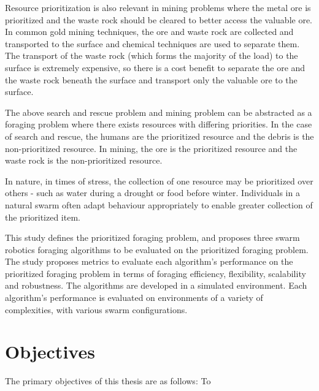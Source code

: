 Resource prioritization is also relevant in mining problems where the metal ore is prioritized and the waste rock should be cleared to better access the valuable ore. In common gold mining techniques, the ore and waste rock are collected and transported to the surface and chemical techniques are used to separate them. The transport of the waste rock (which forms the majority of the load) to the surface is extremely expensive, so there is a cost benefit to separate the ore and the waste rock beneath the surface and transport only the valuable ore to the surface.

The above search and rescue problem and mining problem can be abstracted as a foraging problem where there exists resources with differing priorities. In the case of search and rescue, the humans are the prioritized resource and the debris is the non-prioritized resource. In mining, the ore is the prioritized resource and the waste rock is the non-prioritized resource. 

In nature, in times of stress, the collection of one resource may be prioritized over others - such as water during a drought or food before winter. Individuals in a natural swarm often adapt behaviour appropriately to enable greater collection of the prioritized item.

This study defines the prioritized foraging problem, and proposes three swarm robotics foraging algorithms to be evaluated on the prioritized foraging problem. The study proposes metrics to evaluate each algorithm's performance on the prioritized foraging problem in terms of foraging efficiency, flexibility, scalability and robustness. The algorithms are developed in a simulated environment. Each algorithm's performance is evaluated on environments of a variety of complexities, with various swarm configurations.


\section{Objectives}
\label{sec:introduction:objectives}

The primary objectives of this thesis are as follows: To


